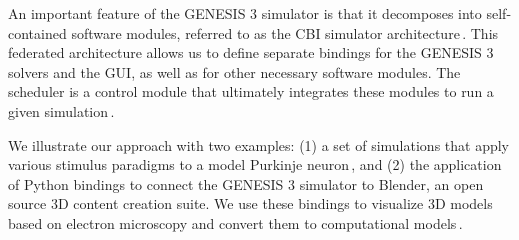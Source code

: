 \documentclass[12pt]{article}
\begin{document}
An important feature of the GENESIS 3 simulator is that it decomposes
into self-contained software modules, referred to as the CBI simulator
architecture\,\cite{cornelis08:_cbi_archit_comput_simul_realis}.  This
federated architecture allows us to define separate bindings for the
GENESIS 3 solvers and the GUI, as well as for other necessary software
modules.  The scheduler is a control module that ultimately integrates
these modules to run a given
simulation\,\cite{cornelis08:_feder_desig_neurob_simul_engin}.

We illustrate our approach with two examples: (1) a set of simulations
that apply various stimulus paradigms to a model Purkinje
neuron\,\cite{schutter94:_simul_purkin}, and (2) the application of
Python bindings to connect the GENESIS 3 simulator to Blender, an open
source 3D content creation suite.  We use these bindings to visualize
3D models based on electron microscopy and convert them to
computational models\,\cite{cornelis08:_model_neuros_genes}.






\end{document}
